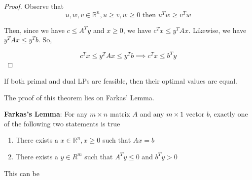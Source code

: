 \documentclass[../notes.tex]{subfiles}
\begin{document}
\begin{proof}
    Observe that
\begin{equation}
    u, w, v \in \mathbb{R}^n, u \ge  v, w \ge 0 \text{ then  } u^Tw \ge v^Tw
\end{equation}

Then, since we have $ c \le  A^T y $ and $ x \ge 0 $, we have $ c^Tx \le  y^T Ax $. Likewise, we have $ y^TAx \le  y^T b $. So,

\begin{equation}
    c^Tx \le  y^T Ax \le  y^T b \implies c^Tx \le  b^Ty
\end{equation}
    
\end{proof}



\begin{theorem}
    If both primal and dual LPs are feasible, then their optimal values are equal.
\end{theorem}

The proof of this theorem lies on Farkas' Lemma.

\begin{lemma}
    \textbf{Farkas's Lemma}: For any $ m \times  n $ matrix $ A $ and any $ m \times 1 $ vector $ b $, exactly one of the following two statements is true

    \begin{enumerate}
        \item There exists a $ x \in \mathbb{R}^n, x \ge  0  $ such that $ Ax = b $
        \item There exists a $ y \in R^m $ such that $ A^Ty \le  0 $ and $ b^Ty > 0 $ 
    \end{enumerate}

\end{lemma}


This can be 
\end{document}

